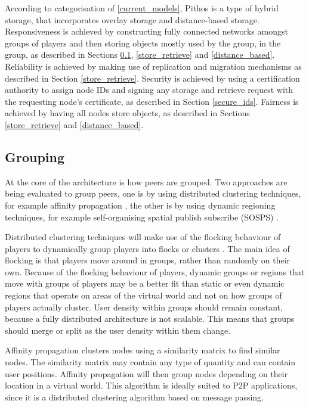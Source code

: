 \documentclass[10pt,a4paper,conference]{IEEEtran}
\begin{document}
According to categorisation of \ref{current_models}, Pithos is a type of hybrid storage, that incorporates overlay storage and distance-based
storage. Responsiveness is achieved by constructing fully connected networks amongst groups of players and then storing objects mostly used by the
group, in the group, as described in Sections \ref{grouping}, \ref{store_retrieve} and \ref{distance_based}. Reliability is achieved by making use of
replication and migration mechanisms as described in Section \ref{store_retrieve}. Security is achieved by using a certification authority to assign
node IDs and signing any storage and retrieve request with the requesting node's certificate, as described in Section \ref{secure_ids}. Fairness is
achieved by having all nodes store objects, as described in Sections \ref{store_retrieve} and \ref{distance_based}.

\subsection{Grouping}
\label{grouping}

At the core of the architecture is how peers are grouped. Two approaches are being evaluated to group peers, one is by using distributed clustering
techniques, for example affinity propagation \cite{affinity_propagation}, the other is by using dynamic regioning techniques, for example
self-organising spatial publish subscribe (SOSPS) \cite{self_organising_sps_post}.

Distributed clustering techniques will make use of the flocking behaviour of players to dynamically group players into flocks or clusters
\cite{flocking}. The main idea of flocking is that players move around in groups, rather than randomly on their own. Because of the flocking
behaviour of players, dynamic groups or regions that move with groups of players may be a better fit than static or even dynamic regions that operate
on areas of the virtual world and not on how groups of players actually cluster. User density within groups should remain constant, because a fully
distributed architecture is not scalable. This means that groups should merge or split as the user density within them change.

Affinity propagation clusters nodes using a similarity matrix to find similar nodes. The similarity matrix may contain any type of quantity and can
contain user positions. Affinity propagation will then group nodes depending on their location in a virtual world. This algorithm is ideally suited
to P2P applications, since it is a distributed clustering algorithm based on message passing.
\end{document}
